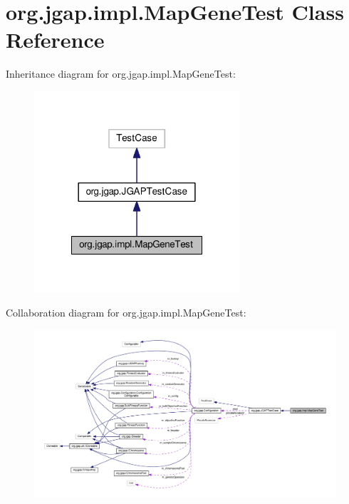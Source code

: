 \hypertarget{classorg_1_1jgap_1_1impl_1_1_map_gene_test}{\section{org.\-jgap.\-impl.\-Map\-Gene\-Test Class Reference}
\label{classorg_1_1jgap_1_1impl_1_1_map_gene_test}
}


Inheritance diagram for org.\-jgap.\-impl.\-Map\-Gene\-Test\-:
\nopagebreak
\begin{figure}[H]
\begin{center}
\leavevmode
\includegraphics[width=216pt]{classorg_1_1jgap_1_1impl_1_1_map_gene_test__inherit__graph}
\end{center}
\end{figure}


Collaboration diagram for org.\-jgap.\-impl.\-Map\-Gene\-Test\-:
\nopagebreak
\begin{figure}[H]
\begin{center}
\leavevmode
\includegraphics[width=350pt]{classorg_1_1jgap_1_1impl_1_1_map_gene_test__coll__graph}
\end{center}
\end{figure}
